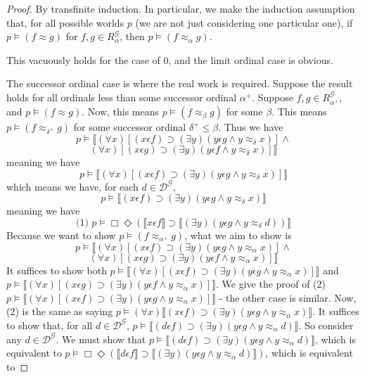 \documentclass{article}
\newcommand{\lbc}{\llbracket}
\newcommand{\rbc}{\rrbracket}
\theoremstyle{definition}
\begin{document}
\begin{proof}
By transfinite induction. In particular, we make the induction assumption that, for all possible worlds 
$p$ (we are not just considering one particular one), if $p\vDash (f\approx g)$ for 
$f,g\in R^\mathcal{G}_\alpha$, then $p\vDash (f\approx_\alpha g)$.

This vacuously holds for the case of $0$, and the limit ordinal case is obvious.

The successor ordinal case is where the real work is required. Suppose the result holds for all 
ordinals less than some successor ordinal $\alpha^+$. Suppose $f,g\in R^\mathcal{G}_{\alpha^+}$, and 
$p\vDash (f\approx g)$. 
Now, this means $p\vDash (f\approx_\beta g)$ for some $\beta$. This means $p\vDash (f\approx_{\delta^+} g)$ for some 
successor ordinal $\delta^+\le\beta$. Thus we have
\[ p\vDash\lbc(\forall x)[(x\epsilon f)\supset(\exists y)(y\epsilon g\wedge y\approx_\delta x)]\wedge \]
\[ (\forall x)[(x\epsilon g)\supset(\exists y)(y\epsilon f\wedge y\approx_\delta x)]\rbc \]
meaning we have
\[ p\vDash\lbc(\forall x)[(x\epsilon f)\supset(\exists y)(y\epsilon g\wedge y\approx_\delta x)]\rbc \]
which means we have, for each $d\in\mathcal{D}^\mathcal{G}$,
\[ p\vDash\lbc(x\epsilon f)\supset(\exists y)(y\epsilon g\wedge y\approx_\delta x)\rbc \]
meaning we have
\[ \textrm{(1) }p\vDash\Box\Diamond(\lbc x\epsilon f\rbc\supset\lbc(\exists y)(y\epsilon g\wedge y\approx_\delta d))\rbc \]
Because we want to show $p\vDash (f\approx_{\alpha^+} g)$, what we aim to show is
\[ p\vDash\lbc(\forall x)[(x\epsilon f)\supset(\exists y)(y\epsilon g\wedge y\approx_\alpha x)]\wedge \]
\[ (\forall x)[(x\epsilon g)\supset(\exists y)(y\epsilon f\wedge y\approx_\alpha x)]\rbc \]
It suffices to show both $p\vDash\lbc(\forall x)[(x\epsilon f)\supset(\exists y)(y\epsilon g\wedge y\approx_\alpha x)]\rbc$ and 
$p\vDash\lbc(\forall x)[(x\epsilon g)\supset(\exists y)(y\epsilon f\wedge y\approx_\alpha x)]\rbc$. We give the proof of 
(2) $p\vDash\lbc(\forall x)[(x\epsilon f)\supset(\exists y)(y\epsilon g\wedge y\approx_\alpha x)]\rbc$ - the other case is similar. Now, (2) 
is the same as saying $p\vDash(\forall x)\lbc(x\epsilon f)\supset(\exists y)(y\epsilon g\wedge y\approx_\alpha x)\rbc$. It suffices to show that, 
for all $d\in\mathcal{D}^\mathcal{G}$, $p\vDash\lbc(d\epsilon f)\supset(\exists y)(y\epsilon g\wedge y\approx_\alpha d)\rbc$. So consider any 
$d\in\mathcal{D}^\mathcal{G}$. We must show that
$p\vDash\lbc(d\epsilon f)\supset(\exists y)(y\epsilon g\wedge y\approx_\alpha d)\rbc$, which is equivalent to
$p\vDash\Box\Diamond(\lbc d\epsilon f\rbc\supset\lbc(\exists y)(y\epsilon g\wedge y\approx_\alpha d)\rbc)$, which is equivalent to

\end{proof}
\end{document}

